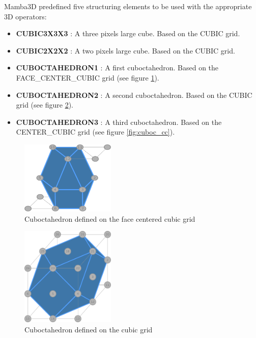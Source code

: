 \documentclass[a4paper,10pt,oneside]{article}
\begin{document}


Mamba3D predefined five structuring elements to be used with the appropriate
3D operators:

\begin{itemize}
\item \textbf{CUBIC3X3X3} : A three pixels large cube. Based on the CUBIC grid.
\item \textbf{CUBIC2X2X2} : A two pixels large cube. Based on the CUBIC grid.
\item \textbf{CUBOCTAHEDRON1} : A first cuboctahedron. Based on the
FACE\_CENTER\_CUBIC grid (see figure \ref{fig:cuboc_fcc}).
\item \textbf{CUBOCTAHEDRON2} : A second cuboctahedron. Based on the
CUBIC grid (see figure \ref{fig:cuboc_c}).
\item \textbf{CUBOCTAHEDRON3} : A third cuboctahedron. Based on the
CENTER\_CUBIC grid (see figure \ref{fig:cuboc_cc}).
\end{itemize}

\begin{figure}
\centering
\includegraphics[width=0.4\textwidth]{figures/Cuboc_on_fccubic.pdf}
\caption{Cuboctahedron defined on the face centered cubic grid}
\label{fig:cuboc_fcc}
\end{figure}

\begin{figure}
\centering
\includegraphics[width=0.4\textwidth]{figures/Cuboc_on_cubic.pdf}
\caption{Cuboctahedron defined on the cubic grid}
\label{fig:cuboc_c}
\end{figure}
\end{document}
